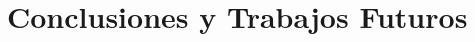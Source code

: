 \documentclass[a4paper,12pt]{report}
\begin{document}
%


%

%

%

%

\setcounter{chapter}{4}
\chapter{Conclusiones y Trabajos Futuros}


%
\end{document}
